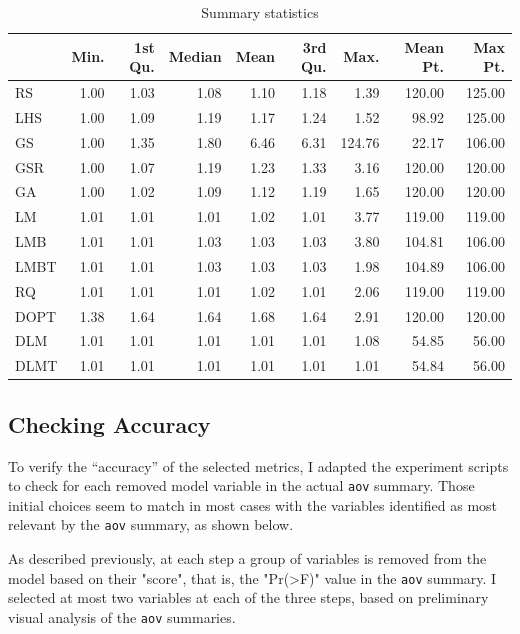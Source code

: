 \documentclass[final,12pt,a4paper]{article}
\begin{document}
\begin{table}[ht]
\centering
\begingroup\small
\begin{tabular}{lrrrrrrrr}
  \hline
 & Min. & 1st Qu. & Median & Mean & 3rd Qu. & Max. & Mean Pt. & Max Pt. \\ 
  \hline
RS & 1.00 & 1.03 & 1.08 & 1.10 & 1.18 & 1.39 & 120.00 & 125.00 \\ 
  LHS & 1.00 & 1.09 & 1.19 & 1.17 & 1.24 & 1.52 & 98.92 & 125.00 \\ 
  GS & 1.00 & 1.35 & 1.80 & 6.46 & 6.31 & 124.76 & 22.17 & 106.00 \\ 
  GSR & 1.00 & 1.07 & 1.19 & 1.23 & 1.33 & 3.16 & 120.00 & 120.00 \\ 
  GA & 1.00 & 1.02 & 1.09 & 1.12 & 1.19 & 1.65 & 120.00 & 120.00 \\ 
  LM & 1.01 & 1.01 & 1.01 & 1.02 & 1.01 & 3.77 & 119.00 & 119.00 \\ 
  LMB & 1.01 & 1.01 & 1.03 & 1.03 & 1.03 & 3.80 & 104.81 & 106.00 \\ 
  LMBT & 1.01 & 1.01 & 1.03 & 1.03 & 1.03 & 1.98 & 104.89 & 106.00 \\ 
  RQ & 1.01 & 1.01 & 1.01 & 1.02 & 1.01 & 2.06 & 119.00 & 119.00 \\ 
  DOPT & 1.38 & 1.64 & 1.64 & 1.68 & 1.64 & 2.91 & 120.00 & 120.00 \\ 
  DLM & 1.01 & 1.01 & 1.01 & 1.01 & 1.01 & 1.08 & 54.85 & 56.00 \\ 
  DLMT & 1.01 & 1.01 & 1.01 & 1.01 & 1.01 & 1.01 & 54.84 & 56.00 \\ 
   \hline
\end{tabular}
\endgroup
\caption{Summary statistics} 
\end{table}
\subsection{Checking Accuracy}
\label{sec:orgc15f3bb}
To verify the ``accuracy'' of the selected metrics, I adapted the experiment
scripts to check for each removed model variable in the actual \texttt{aov} summary.
Those initial choices seem to match in most cases with the variables identified
as most relevant by the \texttt{aov} summary, as shown below.

As described previously, at each step a group of variables is removed from the
model based on their "score", that is, the "Pr(>F)" value in the \texttt{aov} summary.
I selected at most two variables at each of the three steps, based on preliminary
visual analysis of the \texttt{aov} summaries.
\end{document}
